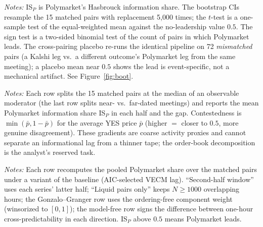 \documentclass[12pt]{article}
\begin{document}
\begin{table}[htbp]\centering
\begin{threeparttable}
\caption{Design-based inference on venue leadership}\label{tab:inference}\small

\begin{tablenotes}\small\item \textit{Notes:} IS$_P$ is Polymarket's Hasbrouck information share.
The bootstrap CIs resample the 15 matched pairs with replacement 5{,}000 times; the $t$-test is a
one-sample test of the equal-weighted mean against the no-leadership value $0.5$. The sign test is
a two-sided binomial test of the count of pairs in which Polymarket leads. The cross-pairing
placebo re-runs the identical pipeline on 72 \emph{mismatched} pairs (a Kalshi leg vs.\ a different
outcome's Polymarket leg from the same meeting); a placebo mean near $0.5$ shows the lead is
event-specific, not a mechanical artifact. See Figure~\ref{fig:boot}.
\end{tablenotes}
\end{threeparttable}
\end{table}

\begin{table}[htbp]\centering
\begin{threeparttable}
\caption{Where the lead comes from: heterogeneity by observable pair characteristics}
\label{tab:hetero}\small

\begin{tablenotes}\small\item \textit{Notes:} Each row splits the 15 matched pairs at the median of
an observable moderator (the last row splits near- vs.\ far-dated meetings) and reports the mean
Polymarket information share IS$_P$ in each half and the gap. Contestedness is
$\min(\bar p, 1-\bar p)$ for the average YES price $\bar p$ (higher $=$ closer to $0.5$, more
genuine disagreement). These gradients are coarse activity proxies and cannot separate an
informational lag from a thinner tape; the order-book decomposition is the analyst's reserved task.
\end{tablenotes}
\end{threeparttable}
\end{table}

\begin{table}[htbp]\centering
\begin{threeparttable}
\caption{Robustness of the pooled leadership statistic to estimator and window}
\label{tab:altspec}\small

\begin{tablenotes}\small\item \textit{Notes:} Each row recomputes the pooled Polymarket share over
the matched pairs under a variant of the baseline (AIC-selected VECM lag). ``Second-half window''
uses each series' latter half; ``Liquid pairs only'' keeps $N\ge1000$ overlapping hours; the
Gonzalo--Granger row uses the ordering-free component weight (winsorized to $[0,1]$); the model-free
row signs the difference between one-hour cross-predictability in each direction. IS$_P$ above
$0.5$ means Polymarket leads.
\end{tablenotes}
\end{threeparttable}
\end{table}
\end{document}
